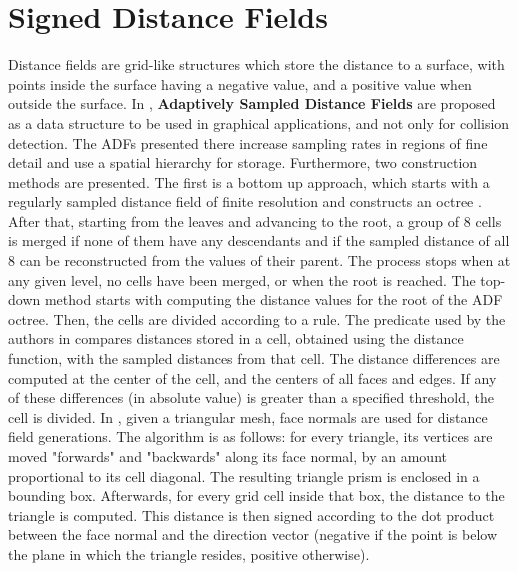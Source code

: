 \FloatBarrier
\section{Signed Distance Fields}
\label{sec:sdf}



Distance fields are grid-like structures which store the distance to a surface, with points inside the surface having a negative value, and a positive value when outside the surface. In \citep{fris00}, \textbf{Adaptively Sampled Distance Fields} are proposed as a data structure to be used in graphical applications, and not only for collision detection. The ADFs presented there increase sampling rates in regions of fine detail and use a spatial hierarchy for storage. Furthermore, two construction methods are presented. The first is a bottom up approach, which starts with a regularly sampled distance field of finite resolution and constructs an octree \citep{fris00}. After that, starting from the leaves and advancing to the root, a group of 8 cells is merged if none of them have any descendants and if the sampled distance of all 8 can be reconstructed from the values of their parent. The process stops when at any given level, no cells have been merged, or when the root is reached. The top-down method starts with computing the distance values for the root of the ADF octree. Then, the cells are divided according to a rule. The predicate used by the authors in \citep{fris00} compares distances stored in a cell, obtained using the distance function, with the sampled distances from that cell. The distance differences are computed at the center of the cell, and the centers of all faces and edges. If any of these differences (in absolute value) is greater than a specified threshold, the cell is divided. In \citep{fsg03}, given a triangular mesh, face normals are used for distance field generations. The algorithm is as follows: for every triangle, its vertices are moved "forwards" and "backwards" along its face normal, by an amount proportional to its cell diagonal. The resulting triangle prism is enclosed in a bounding box. Afterwards, for every grid cell inside that box, the distance to the triangle is computed. This distance is then signed according to the dot product between the face normal and the direction vector (negative if the point is below the plane in which the triangle resides, positive otherwise).



